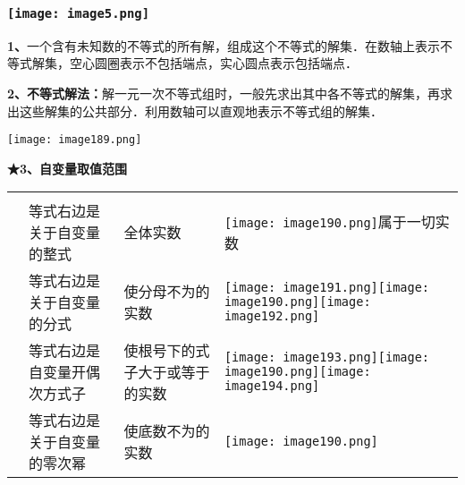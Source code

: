 \hypertarget{section-22}{%
\subsubsection{}\label{section-22}}

\hypertarget{ux5b66ux79d1ux7f51www.zxxk.com--ux6559ux80b2ux8d44ux6e90ux95e8ux6237ux63d0ux4f9bux8bd5ux9898ux8bd5ux5377ux6559ux6848ux8bfeux4ef6ux6559ux5b66ux8bbaux6587ux7d20ux6750ux7b49ux5404ux7c7bux6559ux5b66ux8d44ux6e90ux5e93ux4e0bux8f7dux8fd8ux6709ux5927ux91cfux4e30ux5bccux7684ux6559ux5b66ux8d44ux8baf-34}{%
\subsubsection{\texorpdfstring{\protect\texttt{[image: image5.png]}}{学科网(www.zxxk.com)-\/-教育资源门户，提供试题试卷、教案、课件、教学论文、素材等各类教学资源库下载，还有大量丰富的教学资讯！}}\label{ux5b66ux79d1ux7f51www.zxxk.com--ux6559ux80b2ux8d44ux6e90ux95e8ux6237ux63d0ux4f9bux8bd5ux9898ux8bd5ux5377ux6559ux6848ux8bfeux4ef6ux6559ux5b66ux8bbaux6587ux7d20ux6750ux7b49ux5404ux7c7bux6559ux5b66ux8d44ux6e90ux5e93ux4e0bux8f7dux8fd8ux6709ux5927ux91cfux4e30ux5bccux7684ux6559ux5b66ux8d44ux8baf-34}}

\textbf{1、}一个含有未知数的不等式的所有解，组成这个不等式的解集．在数轴上表示不等式解集，空心圆圈表示不包括端点，实心圆点表示包括端点．

\textbf{2、不等式解法：}解一元一次不等式组时，一般先求出其中各不等式的解集，再求出这些解集的公共部分．利用数轴可以直观地表示不等式组的解集．

\texttt{[image: image189.png]}

\textbf{★3、自变量取值范围}

\begin{longtable}[]{@{}llll@{}}
\toprule
\endhead
& & &\tabularnewline
& 等式右边是关于自变量的整式 & 全体实数 &
\texttt{[image: image190.png]}属于一切实数\tabularnewline
& 等式右边是关于自变量的分式 & 使分母不为的实数 &
\texttt{[image: image191.png]}\texttt{[image: image190.png]}\texttt{[image: image192.png]}\tabularnewline
& 等式右边是自变量开偶次方式子 & 使根号下的式子大于或等于的实数 &
\texttt{[image: image193.png]}\texttt{[image: image190.png]}\texttt{[image: image194.png]}\tabularnewline
& 等式右边是关于自变量的零次幂 & 使底数不为的实数 &
\texttt{[image: image190.png]}\tabularnewline
\bottomrule
\end{longtable}

